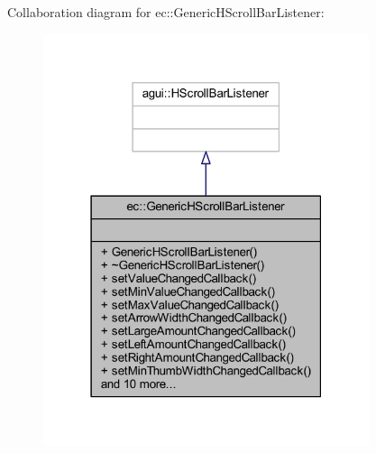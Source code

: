 Collaboration diagram for ec\+:\+:Generic\+H\+Scroll\+Bar\+Listener\+:\nopagebreak
\begin{figure}[H]
\begin{center}
\leavevmode
\includegraphics[width=271pt]{classec_1_1_generic_h_scroll_bar_listener__coll__graph}
\end{center}
\end{figure}
